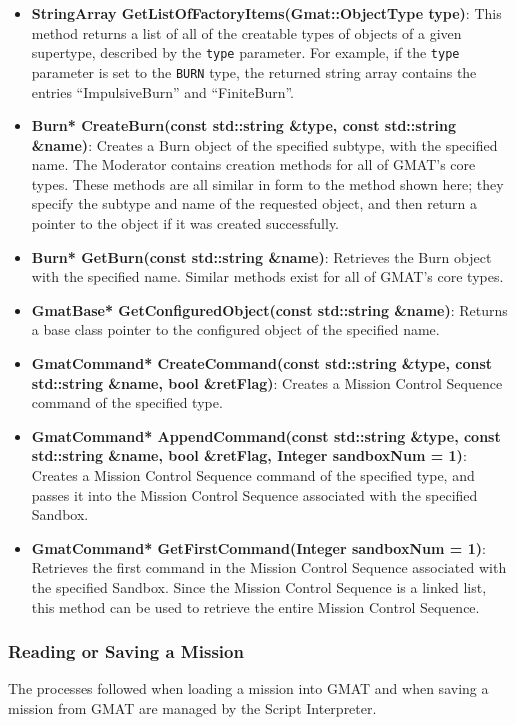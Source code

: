 \begin{itemize}
\item \textbf{StringArray GetListOfFactoryItems(Gmat::ObjectType type)}:  This method returns a
list of all of the creatable types of objects of a given supertype, described by the \texttt{type}
parameter.  For example, if the \texttt{type} parameter is set to the \texttt{BURN} type, the
returned string array contains the entries ``ImpulsiveBurn'' and ``FiniteBurn''.
\item \textbf{Burn* CreateBurn(const std::string \&type, const std::string \&name)}:  Creates a
Burn object of the specified subtype, with the specified name.  The Moderator contains creation
methods for all of GMAT's core types. These methods are all similar in form to the method shown
here; they specify the subtype and name of the requested object, and then return a pointer to the
object if it was created successfully.
\item \textbf{Burn* GetBurn(const std::string \&name)}:  Retrieves the Burn object with the
specified name.  Similar methods exist for all of GMAT's core types.
\item \textbf{GmatBase* GetConfiguredObject(const std::string \&name)}:  Returns a base class
pointer to the configured object of the specified name.
\item \textbf{GmatCommand* CreateCommand(const std::string \&type, const std::string \&name, bool
\&retFlag)}:  Creates a Mission Control Sequence command of the specified type.
\item \textbf{GmatCommand* AppendCommand(const std::string \&type, const std::string \&name, bool
\&retFlag, Integer sandboxNum = 1)}:  Creates a Mission Control Sequence command of the specified
type, and passes it into the Mission Control Sequence associated with the specified Sandbox.
\item \textbf{GmatCommand* GetFirstCommand(Integer sandboxNum = 1)}:  Retrieves the first command
in the Mission Control Sequence associated with the specified Sandbox.  Since the Mission Control
Sequence is a linked list, this method can be used to retrieve the entire Mission Control Sequence.
\end{itemize}

\subsubsection{Reading or Saving a Mission}

The processes followed when loading a mission into GMAT and when saving a mission from GMAT are
managed by the Script Interpreter.

